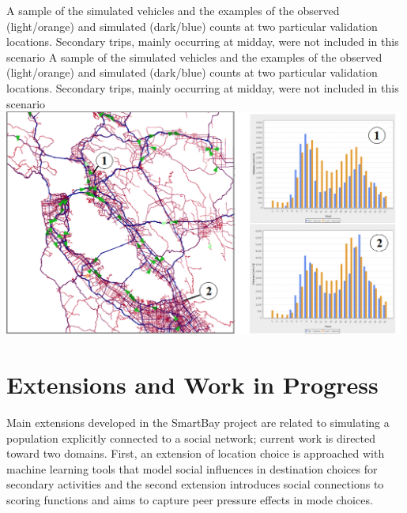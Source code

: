 \createfigure%
{A sample of the simulated vehicles and the examples of the observed (light/orange) and simulated (dark/blue) counts at two particular validation locations. Secondary trips, mainly occurring at midday, were not included in this scenario}%
{A sample of the simulated vehicles and the examples of the observed (light/orange) and simulated (dark/blue) counts at two particular validation locations. Secondary trips, mainly occurring at midday, were not included in this scenario}%
{\label{fig:sf_fig2}}%
{\includegraphics[width=0.99\textwidth, angle=0]{./scenarios/figures/sf_fig2.png}}%
{}

\section{Extensions and Work in Progress}
Main extensions developed in the SmartBay project are related to simulating a population explicitly connected to a social network; current work is directed toward two domains. First, an extension of location choice is approached with machine learning tools that model social influences in destination choices for secondary activities and the second extension introduces social connections to scoring functions and aims to capture peer pressure effects in mode choices.

